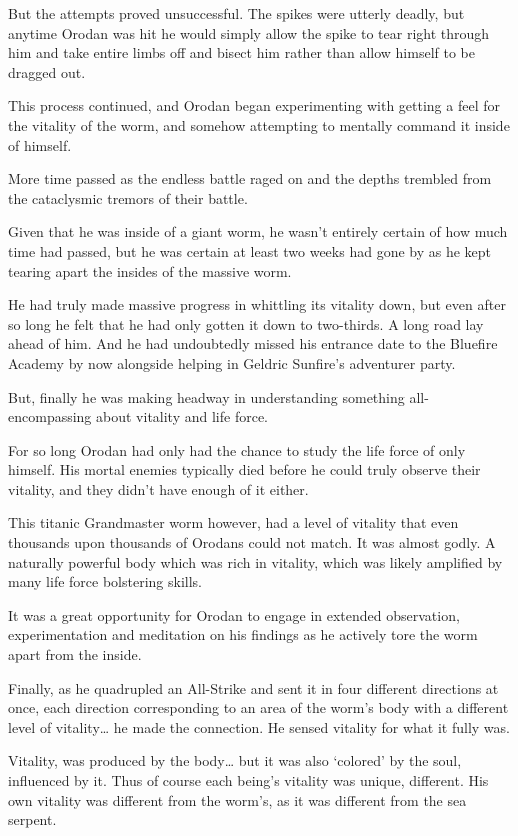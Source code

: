\documentclass[a4paper,10pt]{book}
\begin{document}
But the attempts proved unsuccessful. The spikes were utterly deadly, but anytime Orodan was hit he would simply allow the spike to tear right through him and take entire limbs off and bisect him rather than allow himself to be dragged out.\par
This process continued, and Orodan began experimenting with getting a feel for the vitality of the worm, and somehow attempting to mentally command it inside of himself.\par
More time passed as the endless battle raged on and the depths trembled from the cataclysmic tremors of their battle.\par
Given that he was inside of a giant worm, he wasn’t entirely certain of how much time had passed, but he was certain at least two weeks had gone by as he kept tearing apart the insides of the massive worm.\par
He had truly made massive progress in whittling its vitality down, but even after so long he felt that he had only gotten it down to two-thirds. A long road lay ahead of him. And he had undoubtedly missed his entrance date to the Bluefire Academy by now alongside helping in Geldric Sunfire’s adventurer party.\par
But, finally he was making headway in understanding something all-encompassing about vitality and life force.\par
For so long Orodan had only had the chance to study the life force of only himself. His mortal enemies typically died before he could truly observe their vitality, and they didn’t have enough of it either.\par
This titanic Grandmaster worm however, had a level of vitality that even thousands upon thousands of Orodans could not match. It was almost godly. A naturally powerful body which was rich in vitality, which was likely amplified by many life force bolstering skills.\par
It was a great opportunity for Orodan to engage in extended observation, experimentation and meditation on his findings as he actively tore the worm apart from the inside.\par
Finally, as he quadrupled an All-Strike and sent it in four different directions at once, each direction corresponding to an area of the worm’s body with a different level of vitality… he made the connection. He sensed vitality for what it fully was.\par
Vitality, was produced by the body… but it was also ‘colored’ by the soul, influenced by it. Thus of course each being’s vitality was unique, different. His own vitality was different from the worm’s, as it was different from the sea serpent.\par
\end{document}

